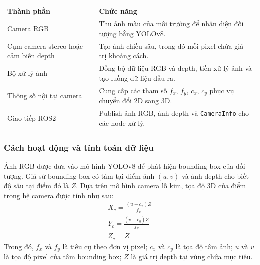 \renewcommand{\arraystretch}{1.25}
\begin{longtable}{|
  >{\raggedright\arraybackslash}p{}|
  >{\raggedright\arraybackslash}p{}|}
\hline
\textbf{Thành phần} & \textbf{Chức năng} \\ \hline
\hline
\endhead
\hline
\endlastfoot
Camera RGB & Thu ảnh màu của môi trường để nhận diện đối tượng bằng
YOLOv8. \\ \hline
Cụm camera stereo hoặc cảm biến depth & Tạo ảnh chiều sâu, trong đó mỗi
pixel chứa giá trị khoảng cách. \\ \hline
Bộ xử lý ảnh & Đồng bộ dữ liệu RGB và depth, tiền xử lý ảnh và tạo luồng
dữ liệu đầu ra. \\ \hline
Thông số nội tại camera & Cung cấp các tham số \(f_{x}\), \(f_{y}\),
\(c_{x}\), \(c_{y}\) phục vụ chuyển đổi 2D sang 3D. \\ \hline
Giao tiếp ROS2 & Publish ảnh RGB, ảnh depth và \texttt{CameraInfo} cho
các node xử lý. \\ \hline
\end{longtable}

\subsubsection{Cách hoạt động và tính toán dữ liệu}

Ảnh RGB được đưa vào mô hình YOLOv8 để phát hiện bounding box của đối
tượng. Giả sử bounding box có tâm tại điểm ảnh \((u,v)\) và ảnh depth
cho biết độ sâu tại điểm đó là \(Z\). Dựa trên mô hình camera lỗ kim,
tọa độ 3D của điểm trong hệ camera được tính như sau:
\begin{gather*}X_{c} = \frac{\left( u - c_{x} \right)Z}{f_{x}} \\[1.5ex]
Y_{c} = \frac{\left( v - c_{y} \right)Z}{f_{y}} \\[1.5ex]
Z_{c} = Z\end{gather*}
Trong đó, \(f_{x}\) và \(f_{y}\) là tiêu cự theo đơn vị pixel; \(c_{x}\)
và \(c_{y}\) là tọa độ tâm ảnh; \(u\) và \(v\) là tọa độ pixel của tâm
bounding box; \(Z\) là giá trị depth tại vùng chứa mục tiêu.

